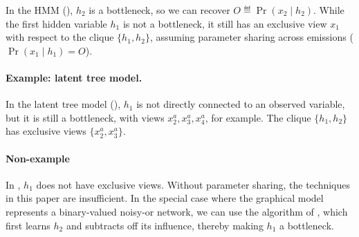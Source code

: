 In the HMM (),
$h_2$ is a bottleneck, so we can recover $O \eqdef \Pr(x_2 \mid h_2)$.
While the first hidden variable $h_1$
is not a bottleneck,
it still has an exclusive view $x_1$ with respect to the clique $\{h_1,h_2\}$,
assuming parameter sharing across emissions ($\Pr(x_1 \mid h_1) = O$).

\paragraph{Example: latent tree model.}

In the latent tree model (),
$h_1$ is not directly connected to an observed variable,
but it is still a bottleneck, with views $x^a_2, x^a_3, x^a_4$, for example.
The clique $\{h_1,h_2\}$ has exclusive views $\{x_2^a,x_3^a\}$.

\paragraph{Non-example}
\label{sec:non-example}

In ,
  $h_1$ does not have exclusive views.
  Without parameter sharing, the techniques in this paper
  are insufficient.
In the special case where the graphical model represents a binary-valued noisy-or network,
  we can use the algorithm of \citet{halpern2013unsupervised},
  which first learns $h_2$ and subtracts off its influence,
  thereby making $h_1$ a bottleneck.
